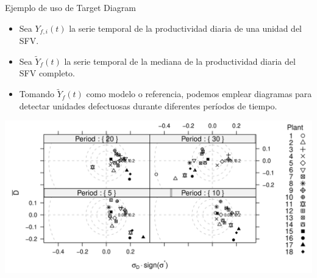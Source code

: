 \documentclass[aspectratio=169, usenames,svgnames,dvipsnames]{beamer}
\begin{document}
\begin{frame}[label={sec:org9eec429}]{Ejemplo de uso de Target Diagram}
\begin{itemize}
\item Sea \(Y_{f,i}(t)\) la serie temporal de la productividad diaria de \alert{una unidad} del SFV.
\item Sea \(\widetilde{Y}_{f}(t)\) la serie temporal de la \alert{mediana} de la productividad diaria del SFV \alert{completo}.
\item Tomando \(\widetilde{Y}_{f}(t)\) como modelo o referencia, podemos
emplear diagramas para detectar unidades defectuosas durante diferentes
períodos de tiempo.
\end{itemize}

\begin{center}
\includegraphics[height=0.6\textheight]{../figs/TargetDiagram_Dia120.pdf}
\end{center}
\end{frame}
\end{document}
